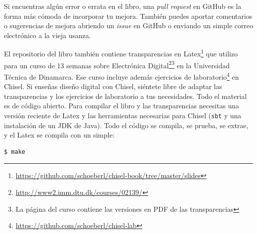 \documentclass[%
    10pt,
    headinclude, footinclude=false,
    openright, %
    notitlepage,
    cleardoublepage=empty,
    headsepline,
    numbers=noenddot,
    bibliography=totoc, index=totoc,
    ]{scrbook}
\newcommand{\code}[1]{{\lstinline[basicstyle=\small\ttfamily]{#1}}}
\newcommand{\myref}[2]{\href{#1}{#2}}
\renewcommand{\myref}[2]{{#2}{\footnote{\url{#1}}}}
\begin{document}

Si encuentras algún error o errata en el libro, una \emph{pull request} en GitHub es la forma más cómoda de incorporar tu mejora.
También puedes aportar comentarios o sugerencias de mejora abriendo un \emph{issue} en GitHub
o enviando un simple correo electrónico a la vieja usanza.


El repositorio del libro también contiene
\myref{https://github.com/schoeberl/chisel-book/tree/master/slides}{transparencias en Latex}
que utilizo para un curso de 13 semanas sobre
\myref{http://www2.imm.dtu.dk/courses/02139/}{Electrónica Digital}\footnote{La página del curso
contiene las versiones en PDF de las transparencias} en la Universidad Técnica de Dinamarca.
Ese curso incluye además \myref{https://github.com/schoeberl/chisel-lab}{ejercicios de laboratorio}
en Chisel.
Si enseñas diseño digital con Chisel, siéntete libre de adaptar las transparencias y los ejercicios
de laboratorio a tus necesidades. Todo el material es de código abierto. Para compilar el libro y las
transparencias necesitas una versión reciente de Latex y las herramientas necesarias para Chisel
(\code{sbt} y una instalación de un JDK de Java). Todo el código se compila, se prueba, se extrae, y el
Latex se compila con un simple:

\begin{verbatim}
$ make
\end{verbatim}

\end{document}
